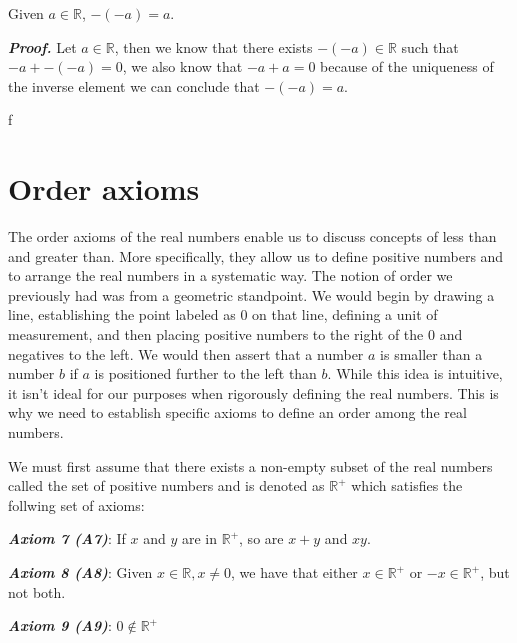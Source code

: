 \documentclass{report}
\begin{document}
    \begin{thBox}
        Given $a \in \mathbb{R}$, $-(-a)=a$.
    \end{thBox}

    \textit{\textbf{Proof.}} Let $a \in \mathbb{R}$, then we know that there exists $-(-a) \in \mathbb{R}$ such that $-a + -(-a) = 0$, we also know that $-a+a=0$ because of the uniqueness of the inverse element we can conclude that $-(-a) = a$.

    \begin{thBox}
        f
    \end{thBox}

    \section{Order axioms}

    The order axioms of the real numbers enable us to discuss concepts of less than and greater than. More specifically, they allow us to define positive numbers and to arrange the real numbers in a systematic way. The notion of order we previously had was from a geometric standpoint. We would begin by drawing a line, establishing the point labeled as $0$ on that line, defining a unit of measurement, and then placing positive numbers to the right of the $0$ and negatives to the left. We would then assert that a number $a$ is smaller than a number $b$ if $a$ is positioned further to the left than $b$. While this idea is intuitive, it isn't ideal for our purposes when rigorously defining the real numbers. This is why we need to establish specific axioms to define an order among the real numbers.


    We must first assume that there exists a non-empty subset of the real numbers called the set of positive numbers and is denoted as $\mathbb{R}^+$ which satisfies the follwing set of axioms:

    \begin{axBox}
        \textit{\textbf{Axiom 7 (A7)}}: If $x$ and $y$ are in $\mathbb{R}^+$, so are $x+y$ and $xy$.
    \end{axBox}

    \begin{axBox}
        \textit{\textbf{Axiom 8 (A8)}}: Given $x \in \mathbb{R}, x\not = 0$, we have that either $x\in \mathbb{R}^+$ or $-x\in \mathbb{R}^+$, but not both.
    \end{axBox}

    \begin{axBox}
        \textit{\textbf{Axiom 9 (A9)}}: $0 \not \in \mathbb{R}^+$
    \end{axBox}
\end{document}
